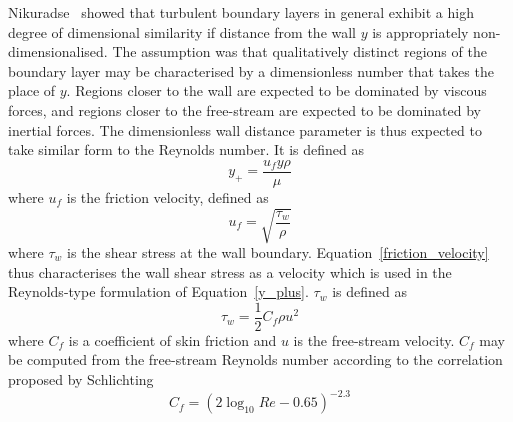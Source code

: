 \documentclass[a4paper, 11pt, oneside]{report}
\begin{document}
Nikuradse~\cite{nikuradse_boundary_layers} showed that turbulent boundary layers in general exhibit a high degree of dimensional similarity if distance from the wall $y$ is appropriately non-dimensionalised. The assumption was that qualitatively distinct regions of the boundary layer may be characterised by a dimensionless number that takes the place of $y$. Regions closer to the wall are expected to be dominated by viscous forces, and regions closer to the free-stream are expected to be dominated by inertial forces. The dimensionless wall distance parameter is thus expected to take similar form to the Reynolds number. It is defined as
\begin{equation}\label{y_plus}
y_+ =
\frac{u_f y \rho}{\mu} 
\end{equation}
where $u_f$ is the friction velocity, defined as
\begin{equation}\label{friction_velocity}
u_f = 
\sqrt{
	\frac{\tau_w}{\rho}
}
\end{equation}
where $\tau_w$ is the shear stress at the wall boundary. Equation~\ref{friction_velocity} thus characterises the wall shear stress as a velocity which is used in the Reynolds-type formulation of Equation~\ref{y_plus}. $\tau_w$ is defined as
\begin{equation}\label{wall_shear_stress_definition}
\tau_w =
\frac{1}{2}
C_f
\rho
u^2
\end{equation}
where $C_f$ is a coefficient of skin friction and $u$ is the free-stream velocity. $C_f$ may be computed from the free-stream Reynolds number according to the correlation proposed by Schlichting~\cite{schlichting_boundary_layer_theory}
\begin{equation}
C_f =
\left(
	2
	\log_{10}
	Re
	-
	0.65
\right)^{-2.3}
\end{equation}
\end{document}
